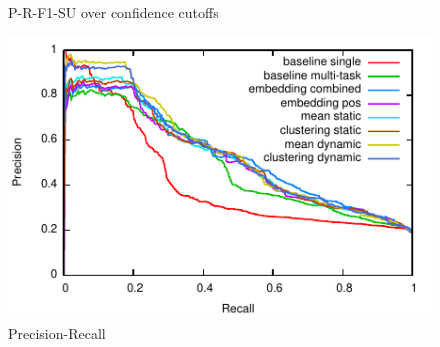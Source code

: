 \documentclass{article}
\begin{document}
{{\begin{figure}[tb]
\caption{P-R-F1-SU over confidence cutoffs}
\label{officialruns}
\end{figure}


\begin{figure}[tb]
\centering
\includegraphics[width=.5\textwidth]{fig/pr/overlapped.pdf}
\caption{Precision-Recall}
\label{precrecall}
\end{figure}

}}
\end{document}

